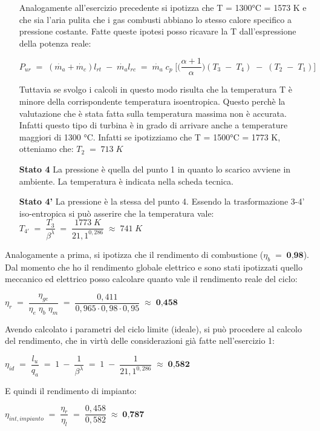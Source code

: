 \documentclass[a4paper, twoside, 12pt]{report}
\begin{document}
\begin{itemize}
	Analogamente all'esercizio precedente si ipotizza che T = 1300°C = 1573 K e che sia l'aria pulita che i gas combusti abbiano lo stesso calore specifico a pressione costante. Fatte queste ipotesi posso ricavare la T dall'espressione della potenza reale:
	\begin{center}
		$P_{ur}\;=\;(\dot{m_{a}}+\dot{m_{c}})l_{rt}\;-\;\dot{m_{a}}l_{rc}\;=\;\dot{m_{a}}\;c_{p}\;\Biggr[\Biggr(\dfrac{\alpha +1}{\alpha}\Biggr)(T_{3}\;-\;T_{4})\;-\;(T_{2}\;-\;T_{1})\Biggr]$
	\end{center}
	Tuttavia se svolgo i calcoli in questo modo risulta che la temperatura T è minore della corrispondente temperatura isoentropica. Questo perchè la valutazione che è stata fatta sulla temperatura massima non è accurata. Infatti questo tipo di turbina è in grado di arrivare anche a temperature maggiori di 1300 °C. Infatti se ipotizziamo che T = 1500°C = 1773 K, otteniamo che:
	$T_{2}\;=\;713\;K$
	\item[\textbf{Stato 4  }] La pressione è quella del punto 1 in quanto lo scarico avviene in ambiente. La temperatura è indicata nella scheda tecnica. 
	\item[\textbf{Stato 4'}] La pressione è la stessa del punto 4. Essendo la trasformazione 3-4' iso-entropica si può asserire che la temperatura vale:\\
	$T_{4'}\;=\;\dfrac{T_{3}}{\beta^{\lambda}}\;=\;\dfrac{1773\;K}{21,1^{0,286}}\;\approx\;741\;K$
\end{itemize}
Analogamente a prima, si ipotizza che il rendimento di combustione ($\eta_{b}\;=\;\textbf{0,98}$). Dal momento che ho il rendimento globale elettrico e sono stati ipotizzati quello meccanico ed elettrico posso calcolare quanto vale il rendimento reale del ciclo:
\begin{center}
	$\eta_{r}\;=\;\dfrac{\eta_{ge}}{\eta_{e}\;\eta_{b}\;\eta_{m}}\;=\;\dfrac{0,411}{0,965\cdot0,98\cdot0,95}\;\approx\;\textbf{0,458}$
\end{center}
Avendo calcolato i parametri del ciclo limite (ideale), si può procedere al calcolo del rendimento, che in virtù delle considerazioni già fatte nell'esercizio 1:
\begin{center}
	$\eta_{id}\;=\;\dfrac{l_{u}}{q_{a}}\;=\;1\:-\;\dfrac{1}{\beta^{\lambda}}\;=\;1\;-\;\dfrac{1}{21,1^{0,286}}\;\approx\;\textbf{0,582}$
\end{center}
E quindi il rendimento di impianto:
\begin{center}
	$\eta_{int,impianto}\;=\;\dfrac{\eta_{r}}{\eta_{l}}\;=\;\dfrac{0,458}{0,582}\;\approx\;\textbf{0,787}$
\end{center}
\end{document}
